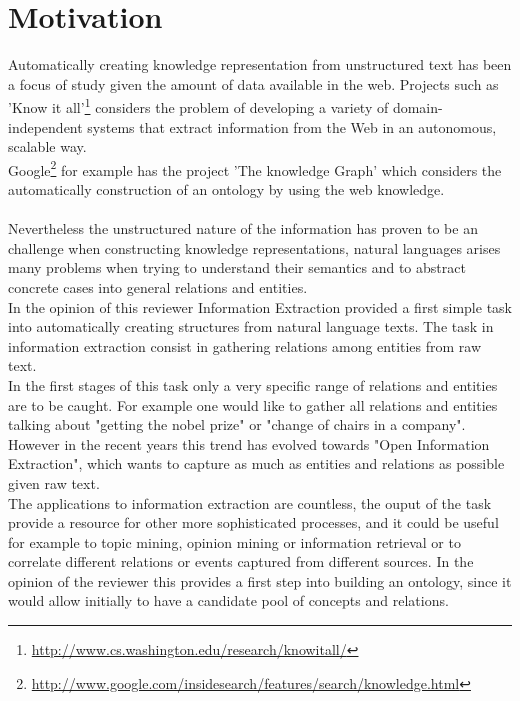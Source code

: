 \documentclass[4pt,a4paper]{article}
\begin{document}
\section{Motivation}

Automatically creating knowledge representation from unstructured text has been a focus of study given the amount of data available in the web.
Projects such as 'Know it all'\footnote{\url{http://www.cs.washington.edu/research/knowitall/}} considers the problem of developing a variety of domain-independent systems that extract information from the Web in an autonomous, scalable way.\\ Google\footnote{\url{http://www.google.com/insidesearch/features/search/knowledge.html}} for example has the project 'The knowledge Graph' which considers the automatically construction of an ontology by using the web knowledge. \\
\\
Nevertheless the unstructured nature of the information has proven to be an challenge when constructing knowledge representations, natural languages arises many problems when trying to understand their semantics and to abstract concrete cases into general relations and entities.\\
In the opinion of this reviewer Information Extraction provided a first simple task into automatically creating structures from natural language texts. The task in information extraction consist in gathering  relations among entities from raw text.\\
In the first stages of this task only a very specific range of relations and entities are to be caught.
For example one would like to gather all relations and entities talking about  "getting the nobel prize" or "change of chairs in a company".\\
However in the recent years this trend has evolved towards "Open Information Extraction", which wants to capture as much as entities and relations as possible given raw text.\\
The applications to information extraction are countless, the ouput of the task provide a resource for other more sophisticated processes, and it could be useful for example to topic mining, opinion mining or information retrieval or to correlate different relations or events captured from different sources.
In the opinion of the reviewer this provides a first step into building an ontology, since it would allow initially to have a candidate pool of concepts and relations.\\
\end{document}
